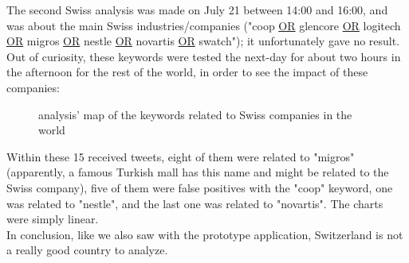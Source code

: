 \documentclass[a4paper,11pt]{report}
\begin{document}
The second Swiss analysis was made on July 21 between 14:00 and 16:00, and was about the main Swiss industries/companies ("coop \underline{OR} glencore \underline{OR} logitech \underline{OR} migros \underline{OR} nestle \underline{OR} novartis \underline{OR} swatch"); it unfortunately gave no result. Out of curiosity, these keywords were tested the next-day for about two hours in the afternoon for the rest of the world, in order to see the impact of these companies:
\begin{figure}[H]
\vspace{-5pt}
\begin{center}
\vspace{-5pt}
\caption{analysis' map of the keywords related to Swiss companies in the world}
\end{center}
\end{figure}
\vspace{-10pt}
Within these 15 received tweets, eight of them were related to "migros" (apparently, a famous Turkish mall has this name and might be related to the Swiss company), five of them were false positives with the "coop" keyword, one was related to "nestle", and the last one was related to "novartis". The charts were simply linear.\\

In conclusion, like we also saw with the prototype application, Switzerland is not a really good country to analyze.
\bigskip
\end{document}
